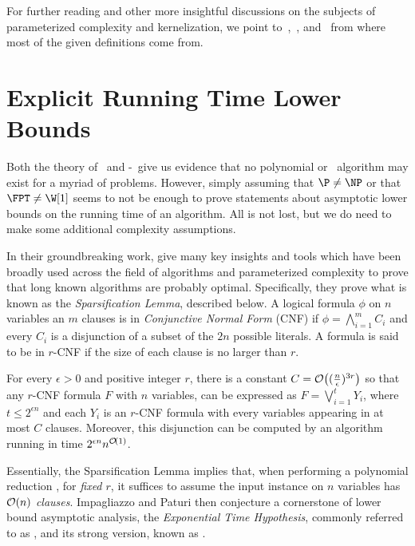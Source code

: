 For further reading and other more insightful discussions on the subjects of parameterized complexity and kernelization, we point to~\citep{downey_fellows},~\citep{cygan_parameterized}, and~\citep{book-kernels} from where most of the given definitions come from. 

\section{Explicit Running Time Lower Bounds}

Both the theory of \NPcness\ and \W[1]-\Hness\ give us evidence that no polynomial or \FPT\ algorithm may exist for a myriad of problems.
However, simply assuming that $\P \neq \NP$ or that $\FPT \neq \W[1]$ seems to not be enough to prove statements about asymptotic lower bounds on the running time of an algorithm.
All is not lost, but we do need to make some additional complexity assumptions.

In their groundbreaking work, \cite{eth} give many key insights and tools which have been broadly used across the field of algorithms and parameterized complexity to prove that long known algorithms are probably optimal.
Specifically, they prove what is known as the \textit{Sparsification Lemma}, described below.
A logical formula $\phi$ on $n$ variables an $m$ clauses is in \textit{Conjunctive Normal Form} (CNF) if $\phi = \bigwedge_{i=1}^m C_i$ and every $C_i$ is a disjunction of a subset of the $2n$ possible literals.
A formula is said to be in $r$-CNF if the size of each clause is no larger than $r$.

\begin{class_definition*}
    For every $\epsilon > 0$ and positive
    integer $r$, there is a constant $C = \mathcal{O}\!\left((\frac{n}{\epsilon})^{3r}\right)$ so that any $r$-CNF formula $F$ with $n$ variables, can be expressed as $F = \bigvee_{i=1}^t Y_i$, where $t \leq 2^{\epsilon n}$ and each $Y_i$ is an $r$-CNF formula with every variables appearing in at most $C$ clauses.
    Moreover, this disjunction can be computed by an algorithm running in time $2^{\epsilon n}n^{\mathcal{O}\!\left(1\right)}$.
\end{class_definition*}

Essentially, the Sparsification Lemma implies that, when performing a polynomial reduction , for \textit{fixed $r$}, it suffices to assume the input instance on $n$ variables has $\mathcal{O}\!\left(n\right)$ \textit{clauses}.
Impagliazzo and Paturi then conjecture a cornerstone of lower bound asymptotic analysis, the \textit{Exponential Time Hypothesis}, commonly referred to as \ETH, and its strong version, known as \SETH.

